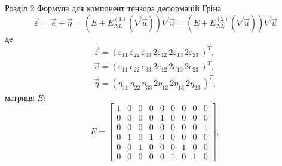 \documentclass[8pt]{beamer}
\numberwithin{figure}{section}
\numberwithin{equation}{section}
\begin{document}
\begin{frame}{Розділ 2}
Формула для компонент тензора деформацій Гріна
\begin{equation}
\vec{\varepsilon}=\vec{e}+\vec{\eta}=\left(E + E_{NL}^{(1)} \left(\vec {\nabla} \vec{u} \right) \right)\vec {\nabla} \vec{u}=\left(E + E_{NL}^{(2)} \left(\vec {\nabla} \vec{u} \right) \right)\vec {\nabla} \vec{u}
\end{equation}
де 
\begin{align}
\vec{\varepsilon} = \left(
\varepsilon_{11}\,
\varepsilon_{22}\,
\varepsilon_{33}\,
2\varepsilon_{12}\,
2\varepsilon_{13}\,
2\varepsilon_{23}\,
\right)^T,\\
\vec{e} = \left( 
e_{11}\,
e_{22}\,
e_{33}\,
2e_{12}\,
2e_{13}\,
2e_{23}\,
\right)^T,\\
\vec{\eta} = \left( 
\eta_{11}\,
\eta_{22}\,
\eta_{33}\,
2\eta_{12}\,
2\eta_{13}\,
2\eta_{23}\,
\right)^T,
\end{align}
матриця $E$:
\begin{equation}
E=\left[\begin{matrix}1 & 0 & 0 & 0 & 0 & 0 & 0 & 0 & 0\\0 & 0 & 0 & 0 & 1 & 0 & 0 & 0 & 0\\0 & 0 & 0 & 0 & 0 & 0 & 0 & 0 & 1\\0 & 1 & 0 & 1 & 0 & 0 & 0 & 0 & 0\\0 & 0 & 1 & 0 & 0 & 0 & 1 & 0 & 0\\0 & 0 & 0 & 0 & 0 & 1 & 0 & 1 & 0\end{matrix}\right],
\end{equation}


\end{frame}
\end{document}
